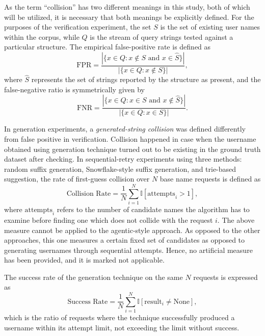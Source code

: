 \documentclass[conference]{IEEEtran}
\begin{document}
As the term “collision” has two different meanings in this study,
both of which will be utilized, it is necessary that both meanings be explicitly defined. For the purposes of the verification experiment, the
set $S$ is the set of existing user names within the corpus, while $Q$
is the stream of query strings tested against a particular structure.
The empirical false-positive rate is defined as
\begin{equation}
\text{FPR} = \frac{|\{x \in Q : x \notin S \text{ and } x \in
\widehat{S}\}|}{|\{x \in Q : x \notin S\}|},
\end{equation}
where $\widehat{S}$ represents the set of strings reported by the
structure as present, and the false-negative ratio is symmetrically
given by
\begin{equation}
\text{FNR} = \frac{|\{x \in Q : x \in S \text{ and } x \notin
\widehat{S}\}|}{|\{x \in Q : x \in S\}|}.
\end{equation}

In generation experiments, a \textit{generated-string collision} was defined differently from false positive in verification. Collision happened in case when the username obtained using generation technique turned out to be existing in the ground truth dataset after checking.
In sequential-retry experiments using three methods: 
random suffix generation, Snowflake-style suffix generation, 
and  trie-based suggestion, the rate of first-guess collision
over $N$ base name requests is defined as
\begin{equation}
\text{Collision Rate} = \frac{1}{N}\sum_{i=1}^{N} \mathbb{I}[
\text{attempts}_i > 1],
\end{equation}
where $\text{attempts}_i$ refers to the number of candidate names the algorithm has to examine before finding one which does not collide with the request $i$. The above measure cannot be applied to the agentic-style approach. As opposed to the other approaches, this one measures
a certain fixed set of candidates as opposed to generating usernames through sequential attempts. Hence, no artificial measure has been provided, and it is marked not applicable.

The success rate of the generation technique on the same $N$ requests
is expressed as 
\begin{equation}
\text{Success Rate} = \frac{1}{N}\sum_{i=1}^{N} \mathbb{I}[
\text{result}_i \neq \text{None}],
\end{equation}
which is the ratio of requests where the technique successfully produced
a username within its attempt limit, not exceeding the limit without success.
\end{document}

